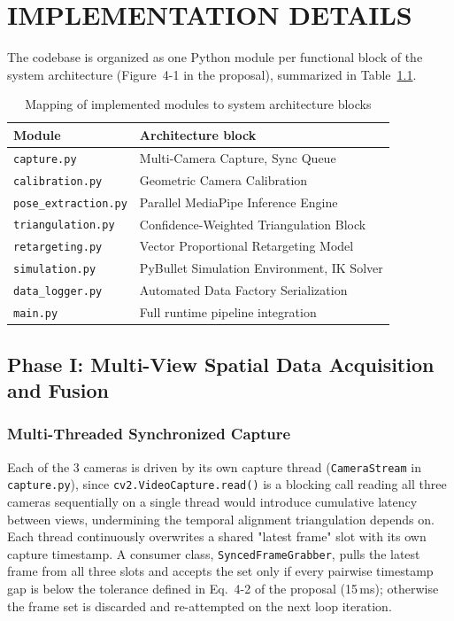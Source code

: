 \chapter{IMPLEMENTATION DETAILS}

The codebase is organized as one Python module per functional block of the
system architecture (Figure~4-1 in the proposal), summarized in
Table~\ref{tab:module-map}.

\begin{table}[h]
\centering
\caption{Mapping of implemented modules to system architecture blocks}
\label{tab:module-map}
\begin{tabular}{ll}
\hline
\textbf{Module} & \textbf{Architecture block} \\
\hline
\texttt{capture.py} & Multi-Camera Capture, Sync Queue \\
\texttt{calibration.py} & Geometric Camera Calibration \\
\texttt{pose\_extraction.py} & Parallel MediaPipe Inference Engine \\
\texttt{triangulation.py} & Confidence-Weighted Triangulation Block \\
\texttt{retargeting.py} & Vector Proportional Retargeting Model \\
\texttt{simulation.py} & PyBullet Simulation Environment, IK Solver \\
\texttt{data\_logger.py} & Automated Data Factory Serialization \\
\texttt{main.py} & Full runtime pipeline integration \\
\hline
\end{tabular}
\end{table}

\section{Phase I: Multi-View Spatial Data Acquisition and Fusion}

\subsection{Multi-Threaded Synchronized Capture}

Each of the 3 cameras is driven by its own capture thread
(\texttt{CameraStream} in \texttt{capture.py}), since
\texttt{cv2.VideoCapture.read()} is a blocking call  reading all three
cameras sequentially on a single thread would introduce cumulative latency
between views, undermining the temporal alignment triangulation depends on.
Each thread continuously overwrites a shared "latest frame" slot with its
own capture timestamp. A consumer class, \texttt{SyncedFrameGrabber}, pulls
the latest frame from all three slots and accepts the set only if every
pairwise timestamp gap is below the tolerance defined in Eq.~4-2 of the
proposal (15\,ms); otherwise the frame set is discarded and re-attempted on
the next loop iteration.

